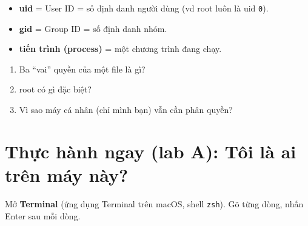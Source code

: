 \documentclass[12pt,a4paper]{article}
\newcommand{\cmd}[1]{\texttt{#1}}
\begin{document}
\begin{notebox}
\begin{itemize}
\item \textbf{uid} = User ID = số định danh người dùng (vd root luôn là uid \cmd{0}).
\item \textbf{gid} = Group ID = số định danh nhóm.
\item \textbf{tiến trình (process)} = một chương trình đang chạy.
\end{itemize}
\end{notebox}

\begin{checkbox}
\begin{enumerate}
\item Ba ``vai'' quyền của một file là gì?
\item root có gì đặc biệt?
\item Vì sao máy cá nhân (chỉ mình bạn) vẫn cần phân quyền?
\end{enumerate}
\end{checkbox}

\section{Thực hành ngay (lab A): Tôi là ai trên máy này?}

Mở \textbf{Terminal} (ứng dụng Terminal trên macOS, shell \cmd{zsh}). Gõ từng dòng,
nhấn Enter sau mỗi dòng.
\end{document}
